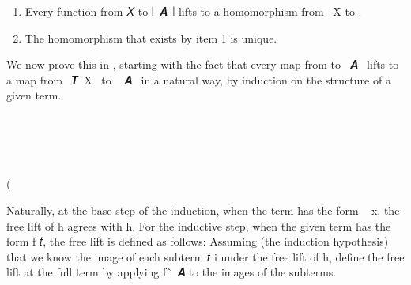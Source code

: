 \begin{enumerate}
\item Every function from \ab 𝑋 to ∣~\ab 𝑨~\af ∣ lifts to a homomorphism from ~\ab X to .
\item The homomorphism that exists by item 1 is unique.
\end{enumerate}

We now prove this in \agda, starting with the fact that every map from  to
~\ab 𝑨~ lifts to a map from ~\af 𝑻~\ab X~ to ~\ab
𝑨~ in a natural way, by induction on the structure of a given term. 
\ccpad
\begin{code}%
\>[1]\AgdaSpace{}%
\AgdaSymbol{:}\AgdaSpace{}%
\AgdaSymbol{(}\AgdaSpace{}%
\AgdaSymbol{:}\AgdaSpace{}%
\AgdaSpace{}%
\AgdaSpace{}%
\AgdaSymbol{)(}\AgdaSpace{}%
\AgdaSymbol{:}\AgdaSpace{}%
\AgdaSpace{}%
\AgdaSpace{}%
\AgdaSpace{}%
\AgdaSpace{}%
\AgdaSymbol{)}\AgdaSpace{}%
\AgdaSpace{}%
\AgdaSpace{}%
\AgdaSpace{}%
\AgdaSpace{}%
\AgdaSpace{}%
\AgdaSpace{}%
\AgdaSpace{}%
\AgdaSpace{}%
\<%
\\
%
\\[\AgdaEmptyExtraSkip]%
%
\>[1]\AgdaSpace{}%
\AgdaSymbol{\AgdaUnderscore{}}\AgdaSpace{}%
\AgdaSpace{}%
\AgdaSymbol{(}\AgdaSpace{}%
\AgdaSymbol{)}\AgdaSpace{}%
\AgdaSymbol{=}\AgdaSpace{}%
\AgdaSpace{}%
\<%
\\
%
\\[\AgdaEmptyExtraSkip]%
%
\>[1]\AgdaSpace{}%
\AgdaSpace{}%
\AgdaSpace{}%
\AgdaSymbol{(}\AgdaSpace{}%
\AgdaSpace{}%
\AgdaSymbol{)}\AgdaSpace{}%
\AgdaSymbol{=}\AgdaSpace{}%
\AgdaSymbol{(}\AgdaSpace{}%
\AgdaSpace{}%
\AgdaSymbol{)}\AgdaSpace{}%
(\AgdaSpace{}%
\AgdaSpace{}%
\AgdaSpace{}%
\AgdaSpace{}%
\AgdaSpace{}%
\AgdaSpace{}%
\AgdaSymbol{(}\AgdaSpace{}%
\AgdaSymbol{))}\<%
\end{code}
\ccpad
Naturally, at the base step of the induction, when the term has the form ~\ab
x, the free lift of \ab h agrees with \ab h.  For the inductive step, when the
given term has the form  \ab f \ab 𝑡, the free lift is defined as
follows: Assuming (the induction hypothesis) that we know the image of each
subterm \ab 𝑡 \ab i under the free lift of \ab h, define the free lift at the
full term by applying \ab f~\af ̂~\ab 𝑨 to the images of the subterms.


